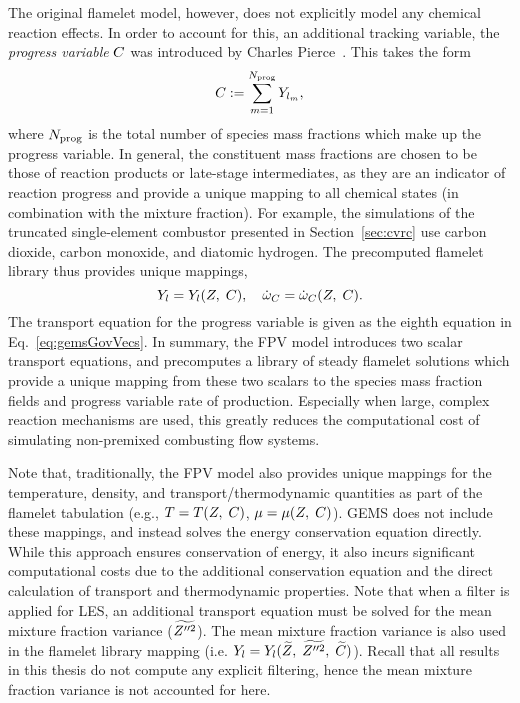 The original flamelet model, however, does not explicitly model any chemical reaction effects. In order to account for this, an additional tracking variable, the \textit{progress variable} $C$ was introduced by Charles Pierce~\cite{Pierce2001}. This takes the form
%
\begin{equation}\label{eq:progVarDef}
	C := \sum_{m = 1}^{N_{\text{prog}}} Y_{l_{m}},
\end{equation}
%
where $N_{\text{prog}}$ is the total number of species mass fractions which make up the progress variable. In general, the constituent mass fractions are chosen to be those of reaction products or late-stage intermediates, as they are an indicator of reaction progress and provide a unique mapping to all chemical states (in combination with the mixture fraction). For example, the simulations of the truncated single-element combustor presented in Section~\ref{sec:cvrc} use carbon dioxide, carbon monoxide, and diatomic hydrogen. The precomputed flamelet library thus provides unique mappings,
%
\begin{equation}
	Y_{l} = Y_{l}(Z, \; C), \quad \dot{\omega}_{C} = \dot{\omega}_{C}(Z, \; C).
\end{equation}
%
The transport equation for the progress variable is given as the eighth equation in Eq.~\ref{eq:gemsGovVecs}. In summary, the FPV model introduces two scalar transport equations, and precomputes a library of steady flamelet solutions which provide a unique mapping from these two scalars to the species mass fraction fields and progress variable rate of production. Especially when large, complex reaction mechanisms are used, this greatly reduces the computational cost of simulating non-premixed combusting flow systems.

Note that, traditionally, the FPV model also provides unique mappings for the temperature, density, and transport/thermodynamic quantities as part of the flamelet tabulation (e.g., $T = T(Z, \; C)$, $\mu = \mu(Z, \; C)$). GEMS does not include these mappings, and instead solves the energy conservation equation directly. While this approach ensures conservation of energy, it also incurs significant computational costs due to the additional conservation equation and the direct calculation of transport and thermodynamic properties. Note that when a filter is applied for LES, an additional transport equation must be solved for the mean mixture fraction variance ($\widetilde{Z''^2}$). The mean mixture fraction variance is also used in the flamelet library mapping (i.e. $Y_{l} = Y_{l}(\widetilde{Z}, \; \widetilde{Z''^2}, \; \widetilde{C})$). Recall that all results in this thesis do not compute any explicit filtering, hence the mean mixture fraction variance is not accounted for here.